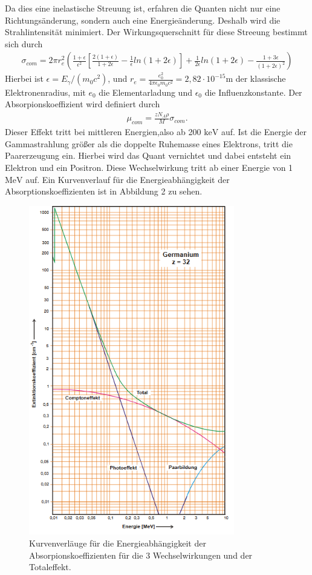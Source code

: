 \noindent Da dies eine inelastische Streuung ist, erfahren die Quanten nicht nur eine Richtungsänderung, sondern auch eine Energieänderung. 
Deshalb wird die Strahlintensität minimiert. Der Wirkungsquerschnitt für diese Streeung bestimmt sich durch
\begin{align}
  \sigma_{com} = 2 \pi r_e^2 \left(\frac{1+\epsilon}{\epsilon^2} \left[\frac{2(1+\epsilon)}{1+2\epsilon}-\frac{1}{\epsilon} ln(1+2\epsilon) \right]
                + \frac{1}{2\epsilon} ln(1+2\epsilon) - \frac{1+3\epsilon}{(1+2\epsilon)^2} \right)
\end{align}
Hierbei ist  $\epsilon = E_{\gamma}/(m_0 c^2)$, und $r_e = \frac{e_0^2}{4 \pi \epsilon_0 m_0 c^2} = 2,82 \cdot 10^{-15}$m der klassische Elektronenradius, mit $e_0$ die Elementarladung und $\epsilon_0$ die Influenzkonstante.
Der Absorpionskoeffizient wird definiert durch
\begin{align}
  \mu_{com} =\frac{z N_A \rho}{M} \sigma_{com}.
\end{align}
Dieser Effekt tritt bei mittleren Energien,also ab 200 $\si{\keV}$ auf.
Ist die Energie der Gammastrahlung größer als die doppelte Ruhemasse eines Elektrons, tritt die Paarerzeugung ein.
Hierbei wird das Quant vernichtet und dabei entsteht ein Elektron und ein Positron.
Diese Wechselwirkung tritt ab einer Energie von 1 $\si{\MeV}$ auf.
Ein Kurvenverlauf für die Energieabhängigkeit der Absorptionskoeffizienten ist in Abbildung 2 zu sehen.
\begin{figure}[H]
  \centering
  \includegraphics[width=0.8\textwidth]{kurve.png}
  \caption{Kurvenverläuge für die Energieabhängigkeit der Absorpionskoeffizienten für die 3 Wechselwirkungen und der Totaleffekt.\cite[S.7]{kent}}
  \label{fig:aufbau}
\end{figure}

